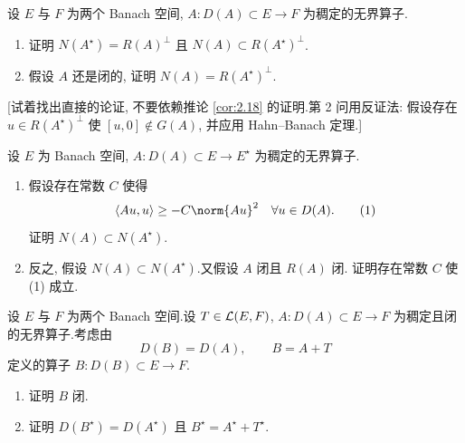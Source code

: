 \begin{exercise}
\label{exer:2.18}
设 $E$ 与 $F$ 为两个 Banach 空间, $A:D(A)\subset E\to F$ 为稠定的无界算子.

\begin{enumerate}[label=\arabic*., leftmargin=2.2em, itemsep=0.25em]
	\item 证明 $N(A^\star)=R(A)^\perp$ 且 $N(A)\subset R(A^\star)^\perp$.
	\item 假设 $A$ 还是闭的, 证明 $N(A)=R(A^\star)^\perp$.
\end{enumerate}
[试着找出直接的论证, 不要依赖推论  \ref{cor:2.18} 的证明.第 2 问用反证法:
假设存在 $u\in R(A^\star)^\perp$ 使 $[u,0]\notin G(A)$, 并应用 Hahn--Banach 定理.]
\end{exercise}

\begin{exercise}
\label{exer:2.19}
设 $E$ 为 Banach 空间, $A:D(A)\subset E\to E^\star$ 为稠定的无界算子.

\begin{enumerate}[label=\arabic*., leftmargin=2.2em, itemsep=0.25em]
	\item 假设存在常数 $C$ 使得
	      \begin{equation}
	      \dual{Au}{u}\ge-C\norm{Au}^2\quad \forall u\in D(A).
	      \tag{1}
	      \end{equation}
	      证明 $N(A)\subset N(A^\star)$.
	\item 反之, 假设 $N(A)\subset N(A^\star)$.又假设 $A$ 闭且 $R(A)$ 闭.
	      证明存在常数 $C$ 使 (1) 成立.
\end{enumerate}
\end{exercise}

\begin{exercise}
\label{exer:2.20}
设 $E$ 与 $F$ 为两个 Banach 空间.设 $T\in\mathcal{L}(E,F)$, $A:D(A)\subset E\to F$
为稠定且闭的无界算子.考虑由
\begin{equation*}
D(B)=D(A),\qquad B=A+T
\end{equation*}
定义的算子 $B:D(B)\subset E\to F$.

\begin{enumerate}[label=\arabic*., leftmargin=2.2em, itemsep=0.25em]
	\item 证明 $B$ 闭.
	\item 证明 $D(B^\star)=D(A^\star)$ 且 $B^\star=A^\star+T^\star$.
\end{enumerate}
\end{exercise}

